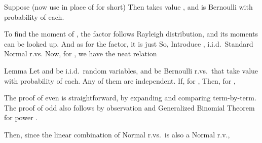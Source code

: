 Suppose (now use  in place of  for short)
Then  takes value , and is Bernoulli with probability  of each.

To find the moment of , the  factor follows Rayleigh distribution, and its moments can be looked up.
And as for the  factor, it is just
So,
Introduce , i.i.d.\ Standard Normal r.vs.
Now, for , we have the neat relation

\Result
{Lemma}
{
Let  and  be i.i.d.\ random variables,
and  be Bernoulli r.vs.\ that take value  with probability  of each.
Any of them are independent.
If, for ,
Then, for ,
}

The proof of even  is straightforward, by expanding and comparing term-by-term.
The proof of odd  also follows by observation  and Generalized Binomial Theorem for power .


Then, since the linear combination of Normal r.vs.\ is also a Normal r.v.,

\stopsubsection

\startsubsection [title={Using Chernoff Bound}]

